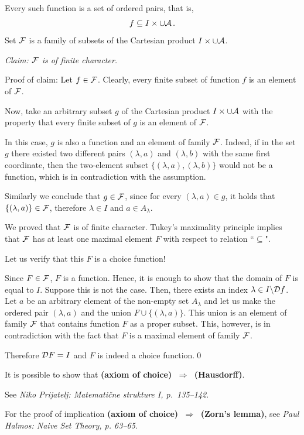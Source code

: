 \documentclass[11pt,paper=b5,footinclude,headinclude]{scrbook} %
\def\sledi {{~\Rightarrow~}}
\theoremstyle{remark}
\theoremstyle{definition} %
\theoremstyle{theorem} %
\begin{document}
Every such function is a set of ordered pairs, that is,
$$f\subseteq I\times \cup {\cal A}\,.$$
Set ${\cal F}$ is a family of subsets of the Cartesian product $I\times \cup {\cal A}$.

\emph{ Claim: ${\cal F}$ is of finite character.}

Proof of claim: Let $f\in{\cal F}$. Clearly, every finite subset of function $f$ is an element of ${\cal F}$.

Now, take an arbitrary subset $g$ of the Cartesian product $I\times \cup {\cal A}$
with the property that every finite subset of $g$ is an element of  ${\cal F}$.

In this case, $g$ is also a function and an element of family ${\cal F}$. Indeed, if
in the set $g$ there existed two different pairs $(\lambda,a)$ and $(\lambda,b)$ with the same first coordinate,
then the two-element subset $\{(\lambda,a),(\lambda,b)\}$ would not be a function, which is in contradiction with the assumption.

Similarly we conclude that $g\in {\cal F}$, since for every $(\lambda,a)\in g$, it holds that
$\{(\lambda,a)\}\in {\cal F}$, therefore $\lambda\in I$ and $a\in A_\lambda$.

We proved that ${\cal F}$ is of finite character.
Tukey's maximality principle implies that ${\cal F}$ has at least one maximal element $F$ with respect to relation ``$\subseteq$".

Let us verify that this $F$ is a choice function!

Since $F\in{\cal F}$, $F$ is a function.
Hence, it is enough to show that the domain of $F$ is equal to $I$.
Suppose this is not the case. Then, there exists an index $\lambda\in I\backslash {\cal D}f$.
Let $a$ be an arbitrary element of the non-empty set $A_\lambda$ and let us make the ordered pair $(\lambda, a)$ and the union $F\cup\{(\lambda,a)\}$. This union is an element of family ${\cal F}$ that contains function $F$ as a proper subset. This, however, is in contradiction with the fact that $F$ is a maximal element of family ${\cal F}$.

Therefore ${\cal D}F = I$ and $F$ is indeed a choice function.\qed

\bigskip

It is possible to show that \textbf{ (axiom of choice) $\sledi$ (Hausdorff)}.

See \emph{ Niko Prijatelj: Matemati\v cne strukture I, p.~135--142}.

For the proof of implication \textbf{ (axiom of choice) $\sledi$ (Zorn's lemma)},
see \emph{ Paul Halmos: Naive Set Theory, p. 63--65}.
\end{document}
